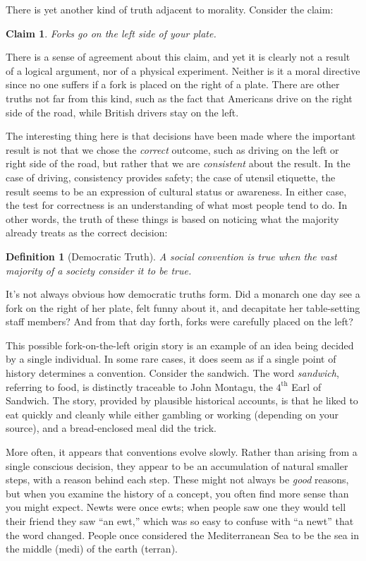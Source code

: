 \documentclass[11pt, oneside]{article}   	%
\newtheorem{defn}{Definition}
\newtheorem{claim}{Claim}
\begin{document}
There is yet another kind of truth adjacent to morality. Consider the claim:
\begin{claim}
    Forks go on the left side of your plate.
\end{claim}

There is a sense of agreement about this claim, and yet it is clearly not a
result of a logical argument, nor of a physical experiment. Neither is it
a moral directive since no one suffers
if a fork is placed on the right of a plate. There are other truths
not far from this kind, such as the fact that Americans drive on the right side
of the road, while British drivers stay on the left.

The interesting thing here is that decisions have been made where the important
result is not that we chose the {\em correct} outcome, such as driving on the
left or right side of the road, but rather that we are {\em consistent} about
the result. In the case of driving, consistency provides safety; the case of
utensil etiquette, the result seems to be an expression of cultural status or
awareness.
In either case, the test for correctness is an understanding of what most people
tend to do. In other words, the truth of these things is based on noticing what
the majority already treats as the correct decision:
\begin{defn}[Democratic Truth]
    A social convention is true when the vast majority of a society consider it
    to be true.
\end{defn}

It's not always obvious how democratic truths form.
Did a monarch one day
see a fork on the right of her plate, felt funny about it, and decapitate her
table-setting staff members? And from that day forth, forks were carefully
placed on the left?

This possible fork-on-the-left origin story is an example of an idea being
decided by a single individual.
In some rare cases, it does seem as if a single point of history determines a
convention.
Consider the sandwich.
The word {\em sandwich}, referring to food, is distinctly traceable to John
Montagu, the $4^\text{th}$ Earl of Sandwich. The story, provided by plausible
historical accounts, is that he liked to eat quickly and cleanly while either
gambling or working (depending on your source), and a bread-enclosed meal did
the trick.

More often, it appears that conventions evolve slowly. Rather than arising from
a single conscious decision, they appear to be an accumulation of natural
smaller steps, with a reason behind each step.
These might not always be {\em good} reasons,
but
when you examine the history of a concept,
you often find more sense
than you might expect. Newts were once ewts; when people saw one they would tell
their friend they saw ``an ewt,'' which was so easy to confuse with ``a newt''
that the word changed. People once considered the Mediterranean Sea to be the
sea in the middle (medi) of the earth (terran).
\end{document}
